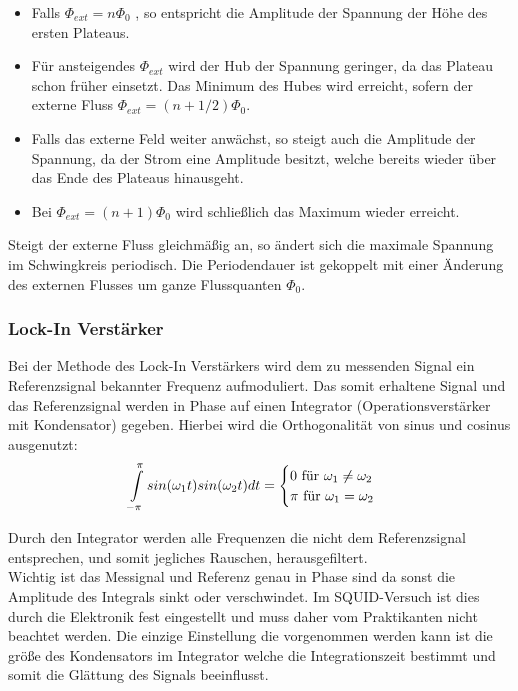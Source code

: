 \documentclass[12pt]{article}
\begin{document}
\begin{itemize}
 \item Falls $\Phi_{ext} = n \Phi_0$ , so entspricht die Amplitude der Spannung der Höhe des ersten Plateaus.
 \item Für ansteigendes $\Phi_{ext}$ wird der Hub der Spannung geringer, da das Plateau schon früher einsetzt.
       Das Minimum des Hubes wird erreicht, sofern der externe Fluss $\Phi_{ext} = (n + 1/2) \Phi_0$.
 \item Falls das externe Feld weiter anwächst, so steigt auch die Amplitude der Spannung, da der Strom eine Amplitude besitzt, welche bereits
       wieder über das Ende des Plateaus hinausgeht.
 \item Bei $\Phi_{ext} = (n + 1) \Phi_0$ wird schließlich das Maximum wieder erreicht.
\end{itemize}

Steigt der externe Fluss gleichmäßig an, so ändert sich die maximale Spannung im Schwingkreis periodisch. Die Periodendauer ist gekoppelt mit einer Änderung des externen Flusses um ganze Flussquanten $\Phi_0$.



\subsubsection{Lock-In Verstärker}
Bei der Methode des Lock-In Verstärkers wird dem zu messenden Signal ein Referenzsignal bekannter Frequenz aufmoduliert.
Das somit erhaltene Signal und das Referenzsignal werden in Phase auf einen Integrator (Operationsverstärker mit Kondensator) gegeben. Hierbei wird die Orthogonalität von
sinus und cosinus ausgenutzt:
\begin{align}
 \int \limits_{-\pi} \limits^{\pi} sin(\omega_1 t)sin(\omega_2 t) dt = \begin{cases} 0 \textnormal{ für } \omega_1\neq\omega_2\\ \pi \textnormal{ für } \omega_1 = \omega_2\end{cases}
\end{align}


Durch den Integrator werden alle Frequenzen die nicht dem Referenzsignal entsprechen, und somit jegliches Rauschen, herausgefiltert. \\

Wichtig ist das Messignal und Referenz genau in Phase sind da sonst die Amplitude des Integrals sinkt oder verschwindet. Im SQUID-Versuch ist dies durch die Elektronik fest eingestellt und muss daher vom Praktikanten nicht beachtet werden. Die einzige Einstellung die vorgenommen werden kann ist die größe des Kondensators im Integrator welche die Integrationszeit bestimmt und somit die Glättung des Signals beeinflusst.
\end{document}

